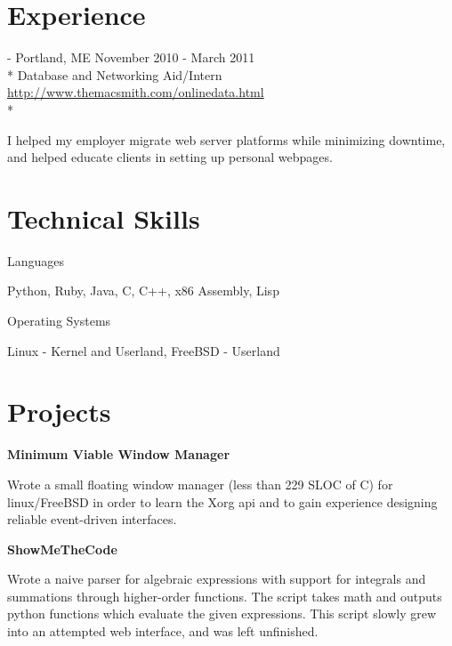\documentclass[letter,margin,line]{resume}
\newcommand{\rurl}[1]{\hfill {\footnotesize \url{#1}}}
\newcommand{\rdate}[1]{\hfill {\small #1}}
\renewcommand{\employer}[5]{\item[#1] - #2 \rdate{#3} \\* #4 \rurl{#5} \\*}
\begin{document}
\begin{resume}
\section{\mysidestyle Experience}
	\begin{asparadesc}
		\employer{MacSmith}{Portland, ME}{November 2010 - March 2011}{Database and Networking Aid/Intern}{http://www.themacsmith.com/onlinedata.html}
		\item\small I helped my employer migrate web server platforms while minimizing downtime, and helped educate clients in setting up personal webpages.
		\normalsize
		\\	
	\end{asparadesc}

\section{\mysidestyle Technical Skills}
	\begin{compactdesc}
		\item[Languages]
			\small\item Python, Ruby, Java, C, C++, x86 Assembly, Lisp
		\item[Operating Systems]
			\small\item Linux - Kernel and Userland, FreeBSD - Userland
	\end{compactdesc}
	
	
\section{\mysidestyle Projects}
	\begin{asparablank}
		\item {\bf Minimum Viable Window Manager}
		
		\small Wrote a small floating window manager (less than 229 SLOC of C) for linux/FreeBSD in order to learn the Xorg api and to gain experience designing reliable event-driven interfaces. 
		\normalsize
		\\
		
		\item {\bf ShowMeTheCode}
		
		\small Wrote a naive parser for algebraic expressions with support for integrals and summations through higher-order functions. The script takes math and outputs python functions which evaluate the given expressions. This script slowly grew into an attempted web interface, and was left unfinished.
		\normalsize		
		\\


\end{asparablank}
\end{resume}
\end{document}
